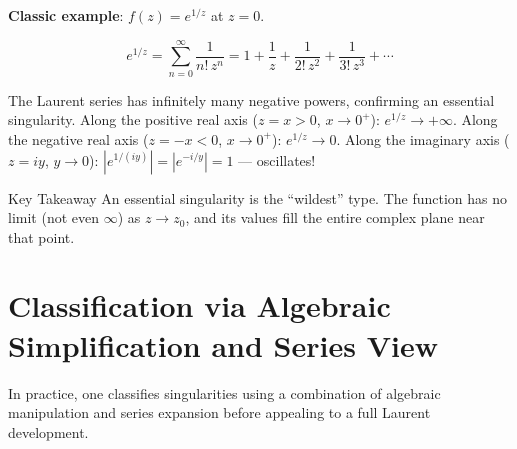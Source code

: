 \documentclass[12pt,a4paper]{article}
\begin{document}
\textbf{Classic example}: $f(z) = e^{1/z}$ at $z = 0$.

\[
  e^{1/z} = \sum_{n=0}^{\infty} \frac{1}{n!\, z^n}
  = 1 + \frac{1}{z} + \frac{1}{2!\,z^2} + \frac{1}{3!\,z^3} + \cdots
\]

The Laurent series has infinitely many negative powers, confirming an essential singularity.
Along the positive real axis ($z = x > 0$, $x \to 0^+$): $e^{1/z} \to +\infty$.
Along the negative real axis ($z = -x < 0$, $x \to 0^+$): $e^{1/z} \to 0$.
Along the imaginary axis ($z = iy$, $y \to 0$): $|e^{1/(iy)}| = |e^{-i/y}| = 1$ --- oscillates!

\begin{learnbox}{Key Takeaway}
An essential singularity is the ``wildest'' type. The function has no limit (not even $\infty$)
as $z \to z_0$, and its values fill the entire complex plane near that point.
\end{learnbox}

\section{Classification via Algebraic Simplification and Series View}

In practice, one classifies singularities using a combination of algebraic manipulation and series
expansion before appealing to a full Laurent development.
\end{document}
